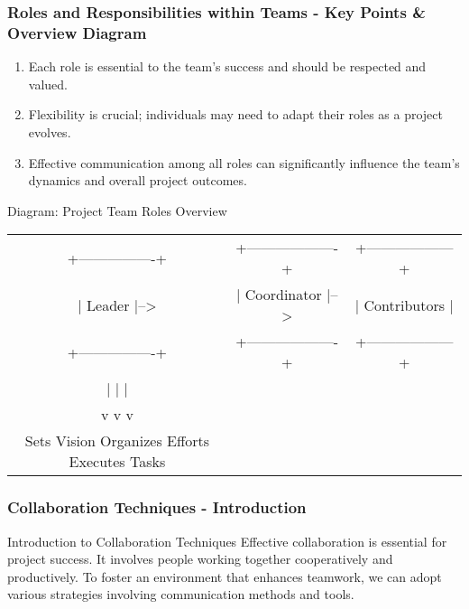 \documentclass[aspectratio=169]{beamer}
\begin{document}
\begin{frame}[fragile]
    \frametitle{Roles and Responsibilities within Teams - Key Points & Overview Diagram}
    \begin{enumerate}
        \item Each role is essential to the team's success and should be respected and valued.
        \item Flexibility is crucial; individuals may need to adapt their roles as a project evolves.
        \item Effective communication among all roles can significantly influence the team's dynamics and overall project outcomes.
    \end{enumerate}
    
    \begin{block}{Diagram: Project Team Roles Overview}
    \begin{center}
        \begin{tabular}{ccc}
            +----------------+ & +-------------------+ & +------------------+ \\
            |    Leader      |-->& |     Coordinator    |-->& |    Contributors   | \\
            +----------------+ & +-------------------+ & +------------------+ \\
                   |                        |                        | \\
                   v                        v                        v \\
               Sets Vision          Organizes Efforts          Executes Tasks \\
        \end{tabular}
    \end{center}
    \end{block}
\end{frame}

\begin{frame}[fragile]
    \frametitle{Collaboration Techniques - Introduction}
    \begin{block}{Introduction to Collaboration Techniques}
        Effective collaboration is essential for project success. It involves people working together cooperatively and productively. To foster an environment that enhances teamwork, we can adopt various strategies involving communication methods and tools.
    \end{block}
\end{frame}
\end{document}
